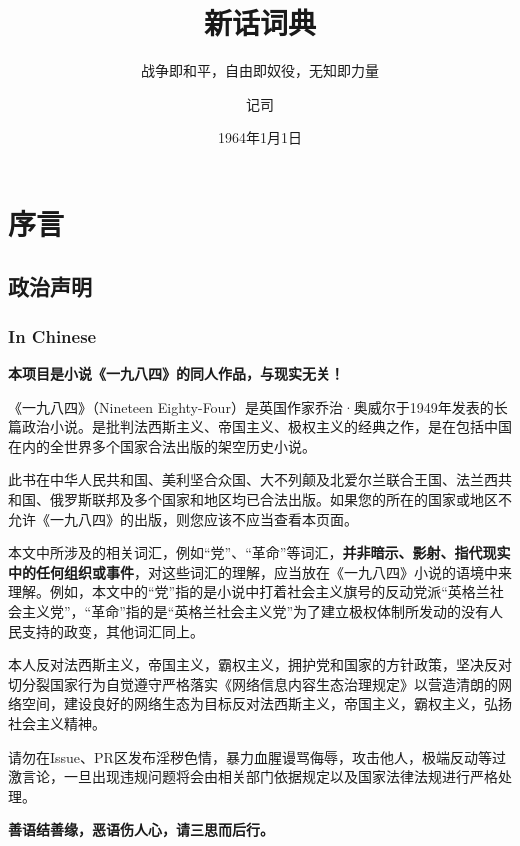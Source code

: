 \documentclass[lang=cn, color=black]{elegantbook}
\title{新话词典}
\subtitle{战争即和平，自由即奴役，无知即力量}
\date{1964年1月1日}
\author{记司}
\institute{真部}
\begin{document}
    \maketitle

    \tableofcontents

    \part*{序言}
        \chapter*{政治声明}
            \section*{In Chinese}
                \textbf{本项目是小说《一九八四》的同人作品，与现实无关！}

                《一九八四》（Nineteen Eighty-Four）是英国作家乔治·奥威尔于1949年发表的长篇政治小说。是批判法西斯主义、帝国主义、极权主义的经典之作，是在包括中国在内的全世界多个国家合法出版的架空历史小说。

                此书在中华人民共和国、美利坚合众国、大不列颠及北爱尔兰联合王国、法兰西共和国、俄罗斯联邦及多个国家和地区均已合法出版。如果您的所在的国家或地区不允许《一九八四》的出版，则您应该不应当查看本页面。

                本文中所涉及的相关词汇，例如“党”、“革命”等词汇，\textbf{并非暗示、影射、指代现实中的任何组织或事件}，对这些词汇的理解，应当放在《一九八四》小说的语境中来理解。例如，本文中的“党”指的是小说中打着社会主义旗号的反动党派“英格兰社会主义党”，“革命”指的是“英格兰社会主义党”为了建立极权体制所发动的没有人民支持的政变，其他词汇同上。

                本人反对法西斯主义，帝国主义，霸权主义，拥护党和国家的方针政策，坚决反对切分裂国家行为自觉遵守严格落实《网络信息内容生态治理规定》以营造清朗的网络空间，建设良好的网络生态为目标反对法西斯主义，帝国主义，霸权主义，弘扬社会主义精神。

                请勿在Issue、PR区发布淫秽色情，暴力血腥谩骂侮辱，攻击他人，极端反动等过激言论，一旦出现违规问题将会由相关部门依据规定以及国家法律法规进行严格处理。
                
                \begin{center}
                    \large
                    \textbf{善语结善缘，恶语伤人心，请三思而后行。}
                \end{center}
            
\end{document}
